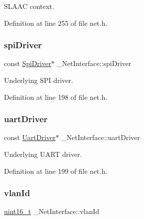 S\+L\+A\+AC context. 



Definition at line 255 of file net.\+h.

\mbox{\label{struct__NetInterface_a693b3caefa91a895d2cc996b021d609c}} 
\subsubsection{\texorpdfstring{spi\+Driver}{spiDriver}}
{\footnotesize\ttfamily const \hyperlink{structSpiDriver}{Spi\+Driver}$\ast$ \+\_\+\+Net\+Interface\+::spi\+Driver}



Underlying S\+PI driver. 



Definition at line 198 of file net.\+h.

\mbox{\label{struct__NetInterface_a8af760257f2838655e488e3a86a0af7c}} 
\subsubsection{\texorpdfstring{uart\+Driver}{uartDriver}}
{\footnotesize\ttfamily const \hyperlink{structUartDriver}{Uart\+Driver}$\ast$ \+\_\+\+Net\+Interface\+::uart\+Driver}



Underlying U\+A\+RT driver. 



Definition at line 199 of file net.\+h.

\mbox{\label{struct__NetInterface_aa70d2a72cb266412abe9a9b447e65da3}} 
\subsubsection{\texorpdfstring{vlan\+Id}{vlanId}}
{\footnotesize\ttfamily \hyperlink{stdint_8h_a273cf69d639a59973b6019625df33e30}{uint16\+\_\+t} \+\_\+\+Net\+Interface\+::vlan\+Id}



